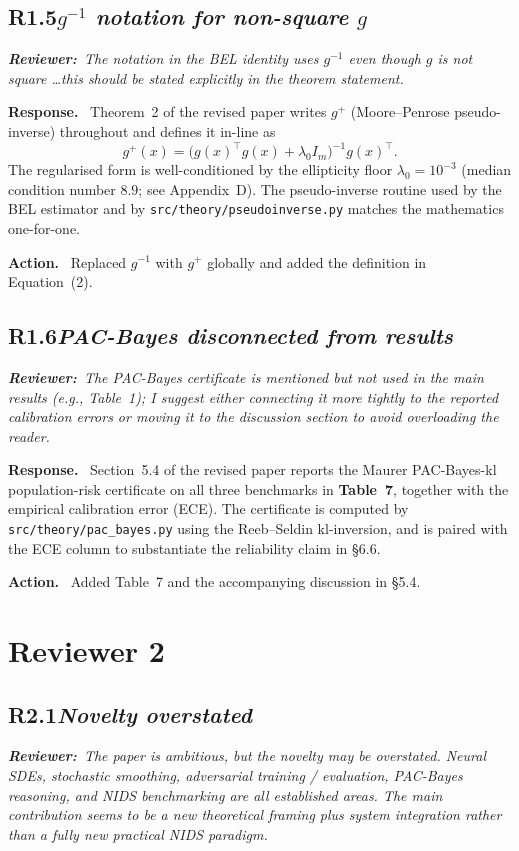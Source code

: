 \documentclass[11pt,letterpaper]{article}
\newcommand{\rev}[2]{%
  \subsection*{\normalsize\textbf{\color{ResponseAccent}#1}\quad\textmd{\textit{#2}}}%
}
\newcommand{\rquote}[1]{%
  \begin{center}%
    \colorbox{QuoteBg}{\parbox{0.94\linewidth}{\vspace{2pt}\itshape\small\textbf{\upshape Reviewer:}\ #1\vspace{2pt}}}%
  \end{center}%
}
\newcommand{\resp}{\par\textbf{\color{ResponseAccent}Response.}\ }
\newcommand{\action}{\par\textbf{\color{ResponseAccent}Action.}\ }
\begin{document}
\rev{R1.5}{$g^{-1}$ notation for non-square $g$}
\rquote{The notation in the BEL identity uses $g^{-1}$ even though $g$
is not square \dots this should be stated explicitly in the theorem
statement.}

\resp
Theorem~2 of the revised paper writes $g^{+}$ (Moore--Penrose
pseudo-inverse) throughout and defines it in-line as
\[
  g^{+}(x)=\bigl(g(x)^{\!\top}g(x)+\lambda_0 I_m\bigr)^{-1}g(x)^{\!\top}.
\]
The regularised form is well-conditioned by the ellipticity floor
$\lambda_0=10^{-3}$ (median condition number $8.9$; see Appendix~D).
The pseudo-inverse routine used by the BEL estimator and by
\texttt{src/theory/pseudoinverse.py} matches the mathematics
one-for-one.
\action
Replaced $g^{-1}$ with $g^{+}$ globally and added the definition in
Equation~(2).

\rev{R1.6}{PAC-Bayes disconnected from results}
\rquote{The PAC-Bayes certificate is mentioned but not used in the
main results (e.g., Table~1); I suggest either connecting it more
tightly to the reported calibration errors or moving it to the
discussion section to avoid overloading the reader.}

\resp
Section~5.4 of the revised paper reports the Maurer PAC-Bayes-kl
population-risk certificate on all three benchmarks in \textbf{Table~7},
together with the empirical calibration error (ECE). The certificate
is computed by \texttt{src/theory/pac\_bayes.py} using the Reeb--Seldin
kl-inversion, and is paired with the ECE column to substantiate the
reliability claim in \S6.6.
\action
Added Table~7 and the accompanying discussion in \S5.4.

\section{Reviewer 2}

\rev{R2.1}{Novelty overstated}
\rquote{The paper is ambitious, but the novelty may be overstated.
Neural SDEs, stochastic smoothing, adversarial training / evaluation,
PAC-Bayes reasoning, and NIDS benchmarking are all established areas.
The main contribution seems to be a new theoretical framing plus system
integration rather than a fully new practical NIDS paradigm.}
\end{document}
